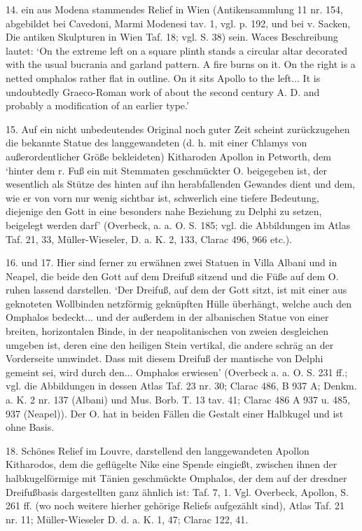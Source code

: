 \documentclass[a4paper, 11pt, oneside]{article}
\begin{document}
14. ein aus Modena stammendes Relief in Wien (Antikensammlung 11 nr. 154, abgebildet bei Cavedoni, Marmi Modenesi tav. 1, vgl. p. 192, und bei v. Sacken, Die antiken Skulpturen in Wien Taf. 18; vgl. S. 38) sein. Waces Beschreibung lautet: `On the extreme left on a square plinth stands a circular altar decorated with the usual bucrania and garland pattern. A fire burns on it. On the right is a netted omphalos rather flat in outline. On it sits Apollo to the left... It is undoubtedly Graeco-Roman work of about the second century A. D. and probably a modification of an earlier type.'

15. Auf ein nicht unbedeutendes Original noch guter Zeit scheint zurückzugehen die bekannte Statue des langgewandeten (d. h. mit einer Chlamys von außerordentlicher Größe bekleideten) Kitharoden Apollon in Petworth, dem `hinter dem r. Fuß ein mit Stemmaten geschmückter O. beigegeben ist, der wesentlich als Stütze des hinten auf ihn herabfallenden Gewandes dient und dem, wie er von vorn nur wenig sichtbar ist, schwerlich eine tiefere Bedeutung, diejenige den Gott in eine besonders nahe Beziehung zu Delphi zu setzen, beigelegt werden darf' (Overbeck, a. a. O. S. 185; vgl. die Abbildungen im Atlas Taf. 21, 33, Müller-Wieseler, D. a. K. 2, 133, Clarac 496, 966 etc.).

16. und 17. Hier sind ferner zu erwähnen zwei Statuen in Villa Albani und in Neapel, die beide den Gott auf dem Dreifuß sitzend und die Füße auf dem O. ruhen lassend darstellen. `Der Dreifuß, auf dem der Gott sitzt, ist mit einer aus geknoteten Wollbinden netzförmig geknüpften Hülle überhängt, welche auch den Omphalos bedeckt... und der außerdem in der albanischen Statue von einer breiten, horizontalen Binde, in der neapolitanischen von zweien desgleichen umgeben ist, deren eine den heiligen Stein vertikal, die andere schräg an der Vorderseite umwindet. Dass mit diesem Dreifuß der mantische von Delphi gemeint sei, wird durch den... Omphalos erwiesen' (Overbeck a. a. O. S. 231 ff.; vgl. die Abbildungen in dessen Atlas Taf. 23 nr. 30; Clarac 486, B 937 A; Denkm. a. K. 2 nr. 137 (Albani) und Mus. Borb. T. 13 tav. 41; Clarac 486 A 937 u. 485, 937 (Neapel)). Der O. hat in beiden Fällen die Gestalt einer Halbkugel und ist ohne Basis.

18. Schönes Relief im Louvre, darstellend den langgewandeten Apollon Kitharodos, dem die geflügelte Nike eine Spende eingießt, zwischen ihnen der halbkugelförmige mit Tänien geschmückte Omphalos, der dem auf der dresdner Dreifußbasis dargestellten ganz ähnlich ist: Taf. 7, 1. Vgl. Overbeck, Apollon, S. 261 ff. (wo noch weitere hierher gehörige Reliefs aufgezählt sind), Atlas Taf. 21 nr. 11; Müller-Wieseler D. d. a. K. 1, 47; Clarac 122, 41.
\end{document}
